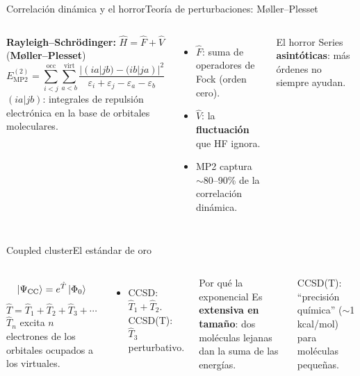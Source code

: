 \documentclass[aspectratio=169]{beamer}
\newcommand{\cplx}[1]{{\footnotesize\color{cookieMuted}#1}}
\begin{document}
\begin{frame}{Correlación dinámica y el horror}{Teoría de perturbaciones: Møller--Plesset}
  \begin{columns}[T,onlytextwidth]
      \textbf{Rayleigh--Schrödinger:} $\hat H=\hat F+\hat V$ \quad (\textbf{Møller--Plesset})
      \[ E_\mathrm{MP2}^{(2)}=\sum_{i<j}^{\mathrm{occ}}\sum_{a<b}^{\mathrm{virt}}
         \frac{|(ia|jb)-(ib|ja)|^{2}}{\varepsilon_i+\varepsilon_j-\varepsilon_a-\varepsilon_b} \]
      \cplx{$(ia|jb)$: integrales de repulsión electrónica en la base de orbitales moleculares.}
      \begin{itemize}\setlength\itemsep{4pt}
        \item $\hat F$: suma de operadores de Fock (orden cero).
        \item $\hat V$: la \textbf{fluctuación} que HF ignora.
        \item MP2 captura $\sim$80--90\% de la correlación dinámica.
      \end{itemize}
      \begin{alertblock}{El horror}
        Series \textbf{asintóticas}: más órdenes no siempre ayudan.
      \end{alertblock}
  \end{columns}
\end{frame}

\begin{frame}{Coupled cluster}{El estándar de oro}
  \begin{columns}[T,onlytextwidth]
      \[ \ket{\Psi_\mathrm{CC}}=e^{\hat T}\ket{\Phi_0} \]
      \[ \hat T=\hat T_1+\hat T_2+\hat T_3+\cdots \]
      \cplx{$\hat T_n$ excita $n$ electrones de los orbitales ocupados a los virtuales.}
      \begin{itemize}\setlength\itemsep{4pt}
        \item CCSD: $\hat T_1+\hat T_2$. CCSD(T): $\hat T_3$ perturbativo.
      \end{itemize}
      \begin{exampleblock}{Por qué la exponencial}
        Es \textbf{extensiva en tamaño}: dos moléculas lejanas dan la suma de las energías.
      \end{exampleblock}
      \cplx{CCSD(T): ``precisión química'' ($\sim$1 kcal/mol) para moléculas pequeñas.}
  \end{columns}
\end{frame}
\end{document}
